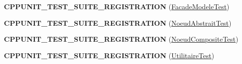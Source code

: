 \begin{DoxyCompactItemize}
\item 
\hypertarget{group__inf2990_gae5d2ecfb5c79d6358557ceadad0315ba}{{\bfseries C\-P\-P\-U\-N\-I\-T\-\_\-\-T\-E\-S\-T\-\_\-\-S\-U\-I\-T\-E\-\_\-\-R\-E\-G\-I\-S\-T\-R\-A\-T\-I\-O\-N} (\hyperlink{class_facade_modele_test}{Facade\-Modele\-Test})}\label{group__inf2990_gae5d2ecfb5c79d6358557ceadad0315ba}

\item 
\hypertarget{group__inf2990_ga39adf4f7daa992efca96297681c4d6db}{{\bfseries C\-P\-P\-U\-N\-I\-T\-\_\-\-T\-E\-S\-T\-\_\-\-S\-U\-I\-T\-E\-\_\-\-R\-E\-G\-I\-S\-T\-R\-A\-T\-I\-O\-N} (\hyperlink{class_noeud_abstrait_test}{Noeud\-Abstrait\-Test})}\label{group__inf2990_ga39adf4f7daa992efca96297681c4d6db}

\item 
\hypertarget{group__inf2990_ga6adb77b2a33a9cca24fb7c8f9ba94fa9}{{\bfseries C\-P\-P\-U\-N\-I\-T\-\_\-\-T\-E\-S\-T\-\_\-\-S\-U\-I\-T\-E\-\_\-\-R\-E\-G\-I\-S\-T\-R\-A\-T\-I\-O\-N} (\hyperlink{class_noeud_composite_test}{Noeud\-Composite\-Test})}\label{group__inf2990_ga6adb77b2a33a9cca24fb7c8f9ba94fa9}

\item 
\hypertarget{group__inf2990_ga7237e6f5011b376fa72793e2148648f3}{{\bfseries C\-P\-P\-U\-N\-I\-T\-\_\-\-T\-E\-S\-T\-\_\-\-S\-U\-I\-T\-E\-\_\-\-R\-E\-G\-I\-S\-T\-R\-A\-T\-I\-O\-N} (\hyperlink{class_utilitaire_test}{Utilitaire\-Test})}\label{group__inf2990_ga7237e6f5011b376fa72793e2148648f3}


\end{DoxyCompactItemize}
